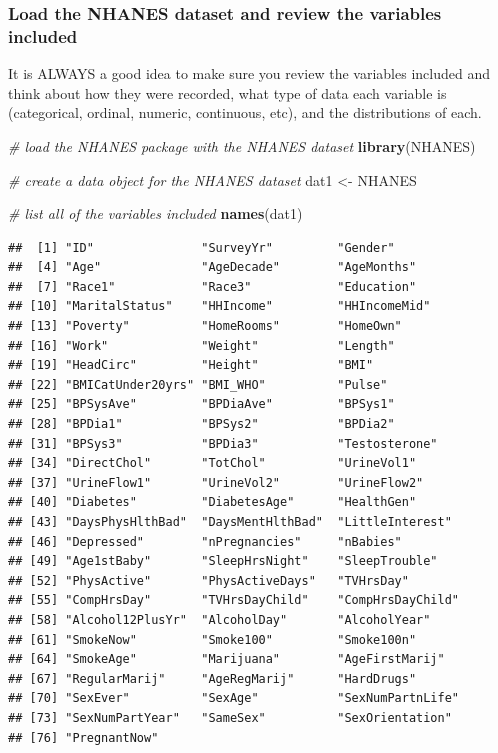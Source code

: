 \documentclass[]{article}
\newenvironment{Shaded}{\begin{snugshade}}{\end{snugshade}}
\newcommand{\KeywordTok}[1]{\textcolor[rgb]{0.13,0.29,0.53}{\textbf{{#1}}}}
\newcommand{\StringTok}[1]{\textcolor[rgb]{0.31,0.60,0.02}{{#1}}}
\newcommand{\CommentTok}[1]{\textcolor[rgb]{0.56,0.35,0.01}{\textit{{#1}}}}
\newcommand{\NormalTok}[1]{{#1}}
\begin{document}
\subsubsection{Load the NHANES dataset and review the variables
included}\label{load-the-nhanes-dataset-and-review-the-variables-included}

It is ALWAYS a good idea to make sure you review the variables included
and think about how they were recorded, what type of data each variable
is (categorical, ordinal, numeric, continuous, etc), and the
distributions of each.

\begin{Shaded}
\begin{Highlighting}[]
\CommentTok{# load the NHANES package with the NHANES dataset}
\KeywordTok{library}\NormalTok{(NHANES)}

\CommentTok{# create a data object for the NHANES dataset}
\NormalTok{dat1 <-}\StringTok{ }\NormalTok{NHANES}

\CommentTok{# list all of the variables included}
\KeywordTok{names}\NormalTok{(dat1)}
\end{Highlighting}
\end{Shaded}

\begin{verbatim}
##  [1] "ID"               "SurveyYr"         "Gender"          
##  [4] "Age"              "AgeDecade"        "AgeMonths"       
##  [7] "Race1"            "Race3"            "Education"       
## [10] "MaritalStatus"    "HHIncome"         "HHIncomeMid"     
## [13] "Poverty"          "HomeRooms"        "HomeOwn"         
## [16] "Work"             "Weight"           "Length"          
## [19] "HeadCirc"         "Height"           "BMI"             
## [22] "BMICatUnder20yrs" "BMI_WHO"          "Pulse"           
## [25] "BPSysAve"         "BPDiaAve"         "BPSys1"          
## [28] "BPDia1"           "BPSys2"           "BPDia2"          
## [31] "BPSys3"           "BPDia3"           "Testosterone"    
## [34] "DirectChol"       "TotChol"          "UrineVol1"       
## [37] "UrineFlow1"       "UrineVol2"        "UrineFlow2"      
## [40] "Diabetes"         "DiabetesAge"      "HealthGen"       
## [43] "DaysPhysHlthBad"  "DaysMentHlthBad"  "LittleInterest"  
## [46] "Depressed"        "nPregnancies"     "nBabies"         
## [49] "Age1stBaby"       "SleepHrsNight"    "SleepTrouble"    
## [52] "PhysActive"       "PhysActiveDays"   "TVHrsDay"        
## [55] "CompHrsDay"       "TVHrsDayChild"    "CompHrsDayChild" 
## [58] "Alcohol12PlusYr"  "AlcoholDay"       "AlcoholYear"     
## [61] "SmokeNow"         "Smoke100"         "Smoke100n"       
## [64] "SmokeAge"         "Marijuana"        "AgeFirstMarij"   
## [67] "RegularMarij"     "AgeRegMarij"      "HardDrugs"       
## [70] "SexEver"          "SexAge"           "SexNumPartnLife" 
## [73] "SexNumPartYear"   "SameSex"          "SexOrientation"  
## [76] "PregnantNow"
\end{verbatim}
\end{document}
